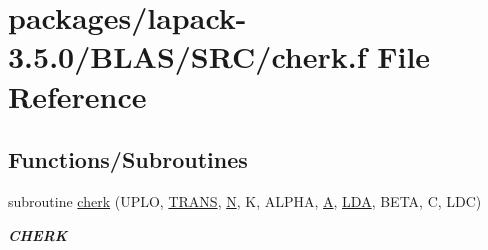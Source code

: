 \hypertarget{lapack-3_85_80_2BLAS_2SRC_2cherk_8f}{}\section{packages/lapack-\/3.5.0/\+B\+L\+A\+S/\+S\+R\+C/cherk.f File Reference}
\label{lapack-3_85_80_2BLAS_2SRC_2cherk_8f}
\subsection*{Functions/\+Subroutines}
\begin{DoxyCompactItemize}
\item 
subroutine \hyperlink{group__complex__blas__level3_gade9f14cf41f0cefea7918d716f3e1c20}{cherk} (U\+P\+L\+O, \hyperlink{superlu__enum__consts_8h_a0c4e17b2d5cea33f9991ccc6a6678d62a1f61e3015bfe0f0c2c3fda4c5a0cdf58}{T\+R\+A\+N\+S}, \hyperlink{polmisc_8c_a0240ac851181b84ac374872dc5434ee4}{N}, K, A\+L\+P\+H\+A, \hyperlink{classA}{A}, \hyperlink{example__user_8c_ae946da542ce0db94dced19b2ecefd1aa}{L\+D\+A}, B\+E\+T\+A, C, L\+D\+C)
\begin{DoxyCompactList}\small\item\em {\bfseries C\+H\+E\+R\+K} \end{DoxyCompactList}\end{DoxyCompactItemize}
